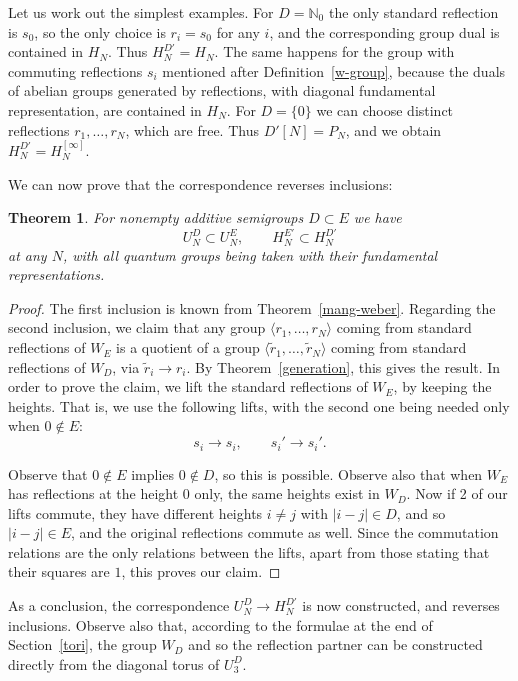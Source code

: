 \documentclass[11pt,a4paper]{article}
\newtheorem{thm}{Theorem}[section]
\begin{document}
Let us work out the simplest examples. For $D=\mathbb N_0$ the only standard reflection is $s_0$, so the only choice is $r_i=s_0$ for any $i$, and the corresponding group dual is contained in $H_N$. Thus $H_N^{D'}=H_N$. The same happens for the group with commuting reflections $s_i$ mentioned after Definition~\ref{w-group}, because the duals of abelian groups generated by reflections, with diagonal fundamental representation, are contained in $H_N$. For $D=\{0\}$ we can choose distinct reflections $r_1,\ldots,r_N$, which are free. Thus $D'[N]=P_N$, and we obtain $H_N^{D'}=H_N^{[\infty]}$.

We can now prove that the correspondence reverses inclusions:

\begin{thm}\label{torus-partner}
For nonempty additive semigroups $D\subset E$ we have
\[
 U_N^D\subset U_N^E,\qquad H_N^{E'}\subset H_N^{D'}
\]
at any $N$, with all quantum groups being taken with their fundamental representations.
\end{thm}

\begin{proof}
The first inclusion is known from Theorem~\ref{mang-weber}. Regarding the second inclusion, we claim that any group $\langle r_1,\ldots,r_N\rangle$ coming from standard reflections of $W_E$ is a quotient of a group $\langle\tilde r_1,\ldots,\tilde r_N\rangle$ coming from standard reflections of $W_D$, via $\tilde r_i\to r_i$. By Theorem~\ref{generation}, this gives the result. In order to prove the claim, we lift the standard reflections of $W_E$, by keeping the heights. That is, we use the following lifts, with the second one being needed only when $0\notin E$:
\[
 s_i\to s_i,\qquad s_i'\to s_i'.
\]

Observe that $0\notin E$ implies $0\notin D$, so this is possible. Observe also that when $W_E$ has reflections at the height $0$ only, the same heights exist in $W_D$. Now if 2 of our lifts commute, they have different heights $i\neq j$ with $|i-j|\in D$, and so $|i-j|\in E$, and the original reflections commute as well. Since the commutation relations are the only relations between the lifts, apart from those stating that their squares are $1$, this proves our claim.
\end{proof}

As a conclusion, the correspondence $U_N^D\to H_N^{D'}$ is now constructed, and reverses inclusions. Observe also that, according to the formulae at the end of Section~\ref{tori}, the group $W_D$ and so the reflection partner can be constructed directly from the diagonal torus of $U_3^D$.
\end{document}
